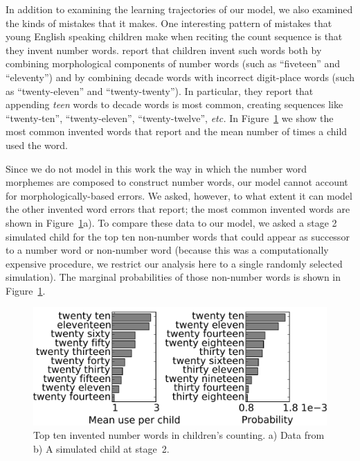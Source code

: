 \documentclass[10pt,letterpaper]{article}
\begin{document}
In addition to examining the learning trajectories of our model, we
also examined the kinds of mistakes that it makes. One interesting
pattern of mistakes that young English speaking children make when
reciting the count sequence is that they invent number
words. \citeauthor{FusRicBriar1982} report that children invent such
words both by combining morphological components of number words (such
as ``fiveteen'' and ``eleventy'') and by combining decade words with
incorrect digit-place words (such as ``twenty-eleven'' and
``twenty-twenty''). In particular, they report that appending
\emph{teen} words to decade words is most common, creating sequences
like ``twenty-ten'', ``twenty-eleven'', ``twenty-twelve'', {\it etc.}
In Figure~\ref{fig:inventedWordComparison} we show the most common invented
words that \citeauthor{FusRicBriar1982} report and the mean number of
times a child used the word. 

Since we do not model in this work the way in which the number word
morphemes are composed to construct number words, our model cannot
account for morphologically-based errors. We asked, however, to what
extent it can model the other invented word errors that
\citeauthor{FusRicBriar1982} report; the most common invented words
are shown in Figure~\ref{fig:inventedWordComparison}a). To compare
these data to our model, we asked a stage 2 simulated child for the
top ten non-number words that could appear as successor to a number
word or non-number word (because this was a computationally expensive
procedure, we restrict our analysis here to a single randomly selected
simulation). The marginal probabilities of those non-number words is
shown in Figure~\ref{fig:inventedWordComparison}.

\begin{figure}[t]
\includegraphics[width=0.9\linewidth]{figures/inventedWordComparison3}
\caption{Top ten invented number words in children's counting. a) Data
  from \citeauthor{FusRicBriar1982} b) A simulated child at stage~2.
   \label{fig:inventedWordComparison}}
\end{figure}
\end{document}
